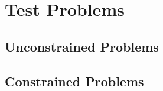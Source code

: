 \section{Test Problems}

\blindtext{}

\subsection{Unconstrained Problems}

\blindtext{}

\subsection{Constrained Problems}

\blindtext{}
